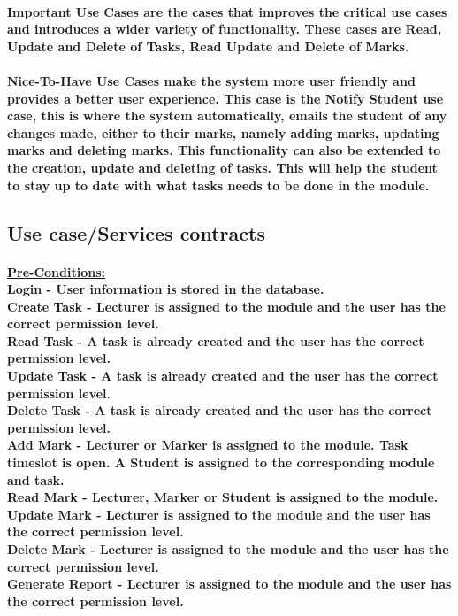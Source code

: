 \documentclass[12pt]{article}
\begin{document}
 \paragraph*{Important Use Cases are the cases that improves the critical use cases and introduces a wider variety of functionality. These cases are Read, Update and Delete of Tasks, Read Update  and Delete of Marks.}
 \paragraph*{Nice-To-Have Use Cases make the system more user friendly and provides a better user experience. This case is the Notify Student use case, this is where the system automatically, emails the student of any changes made, either to their marks, namely adding marks, updating marks and deleting marks. This functionality can also be extended to the creation, update and deleting of tasks. This will help the student to stay up to date with what tasks needs to be done in the module.}
 \subsection{Use case/Services contracts}
 \paragraph*{\underline{Pre-Conditions: }\\ Login - User information is stored in the database.
 \\ Create Task - Lecturer is assigned to the module and the user has the correct permission level.
 \\ Read Task - A task is already created and the user has the correct permission level.
 \\ Update Task - A task is already created and the user has the correct permission level.
 \\ Delete Task - A task is already created and the user has the correct permission level.
 \\ Add Mark - Lecturer or Marker is assigned to the module. Task timeslot is open. A Student is assigned to the corresponding module and task.
 \\ Read Mark - Lecturer, Marker or Student is assigned to the module.
 \\ Update Mark - Lecturer is assigned to the module and the user has the correct permission level.
 \\ Delete Mark - Lecturer is assigned to the module and the user has the correct permission level.
 \\ Generate Report - Lecturer is assigned to the module and the user has the correct permission level.}
\end{document}
